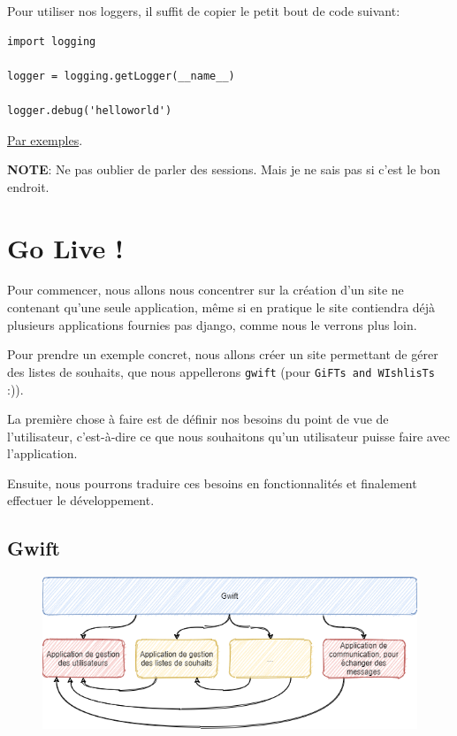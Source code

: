 \documentclass[11pt]{amsbook}
\newcommand{\admonition}[2]{\textbf{#1}: {#2}}
\begin{document}
Pour utiliser nos loggers, il suffit de copier le petit bout de code suivant:


\begin{verbatim}
import logging

logger = logging.getLogger(__name__)

logger.debug('helloworld')
\end{verbatim}

\href{https://docs.djangoproject.com/en/stable/topics/logging/#examples}{Par exemples}.


\admonition{NOTE}{Ne pas oublier de parler des sessions. Mais je ne sais pas si c’est le bon endroit.}
\hypertarget{x-go-live-!}{\part*{Go Live !}}
Pour commencer, nous allons nous concentrer sur la création d’un site ne contenant qu’une seule application, même si en pratique le site contiendra déjà plusieurs applications fournies pas django, comme nous le verrons plus loin.


Pour prendre un exemple concret, nous allons créer un site permettant de gérer des listes de souhaits, que nous appellerons \texttt{gwift} (pour \texttt{GiFTs and WIshlisTs} :)).


La première chose à faire est de définir nos besoins du point de vue de l’utilisateur, c’est-à-dire ce que nous souhaitons qu’un utilisateur puisse faire avec l’application.


Ensuite, nous pourrons traduire ces besoins en fonctionnalités et finalement effectuer le développement.


\hypertarget{x-gwift}{\chapter{Gwift}}
\begin{figure}[h]{}
\centering\includegraphics[width=2.5truein]{images/django/django-project-vs-apps-gwift.png}
\caption{}

\end{figure}
\end{document}
